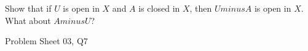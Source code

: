\begin{samepage}
\begin{ex}
Show that if $U$ is open in $X$ and $A$ is closed in $X$, then $U minus A$ is open in $X$. What about $A minus U$?
\end{ex}
\begin{source}
Problem Sheet 03, Q7
\end{source}
\end{samepage}
